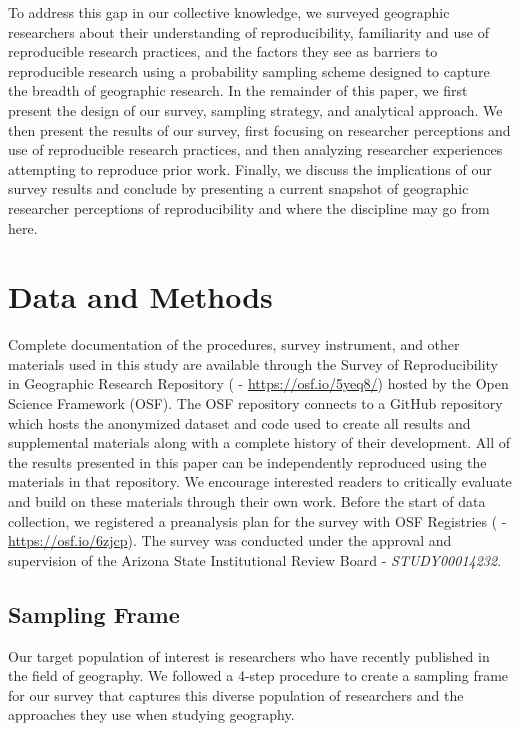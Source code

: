 \documentclass[]{interact}
\theoremstyle{plain}%
\theoremstyle{definition}
\theoremstyle{remark}
\begin{document}
To address this gap in our collective knowledge, we surveyed geographic researchers about their understanding of reproducibility, familiarity and use of reproducible research practices, and the factors they see as barriers to reproducible research using a probability sampling scheme designed to capture the breadth of geographic research.
In the remainder of this paper, we first present the design of our survey, sampling strategy, and analytical approach. 
We then present the results of our survey, first focusing on researcher perceptions and use of reproducible research practices, and then analyzing researcher experiences attempting to reproduce prior work. 
Finally, we discuss the implications of our survey results and conclude by presenting a current snapshot of geographic researcher perceptions of reproducibility and where the discipline may go from here. 


\section*{Data and Methods}
Complete documentation of the procedures, survey instrument, and other materials used in this study are available through the Survey of Reproducibility in Geographic Research Repository (\citet{Kedron_Holler_Bardin_Hilgendorf_2022} - \url{https://osf.io/5yeq8/}) hosted by the Open Science Framework (OSF).
The OSF repository connects to a GitHub repository which hosts the anonymized dataset and code used to create all results and supplemental materials along with a complete history of their development. 
All of the results presented in this paper can be independently reproduced using the materials in that repository.
We encourage interested readers to critically evaluate and build on these materials through their own work.
Before the start of data collection, we registered a preanalysis plan for the survey with OSF Registries (\citet{Kedron_Survey_PAP} - \url{https://osf.io/6zjcp}). 
The survey was conducted under the approval and supervision of the Arizona State Institutional Review Board - \textit{STUDY00014232}.

\subsection*{Sampling Frame}
Our target population of interest is researchers who have recently published in the field of geography. 
We followed a 4-step procedure to create a sampling frame for our survey that captures this diverse population of researchers and the approaches they use when studying geography. 
\end{document}
